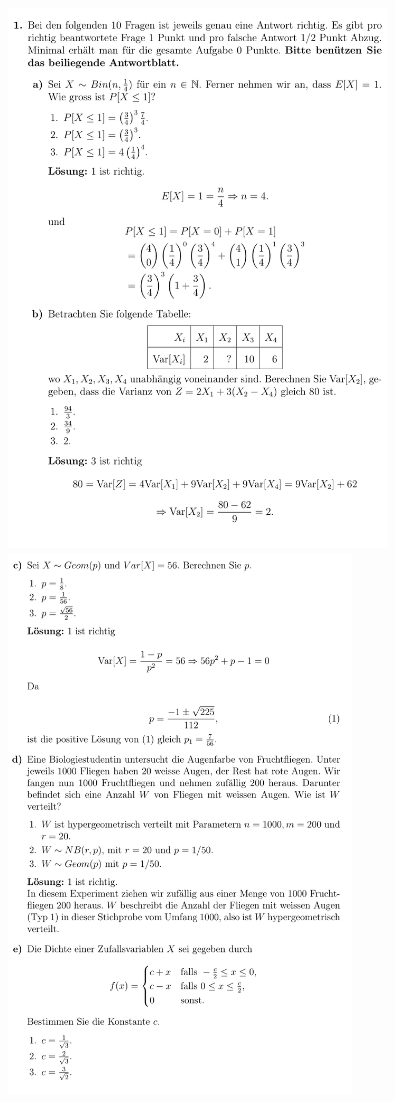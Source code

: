 \includegraphics[height=143mm]{old_exams_prtsrc/tei_infk_so17_ml-03.png}\newline
\includegraphics[height=143mm]{old_exams_prtsrc/tei_infk_so17_ml-04.png}\newline
